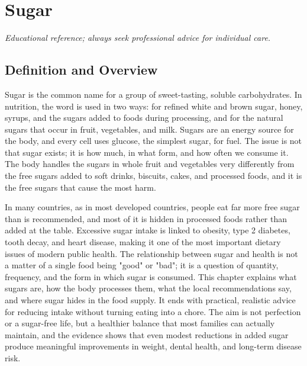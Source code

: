 \chapter{Sugar}

\medskip
\noindent\textit{Educational reference; always seek professional advice for individual care.}

\section*{Definition and Overview}
Sugar is the common name for a group of sweet-tasting, soluble carbohydrates. In nutrition, the word is used in two ways: for refined white and brown sugar, honey, syrups, and the sugars added to foods during processing, and for the natural sugars that occur in fruit, vegetables, and milk. Sugars are an energy source for the body, and every cell uses glucose, the simplest sugar, for fuel. The issue is not that sugar exists; it is how much, in what form, and how often we consume it. The body handles the sugars in whole fruit and vegetables very differently from the free sugars added to soft drinks, biscuits, cakes, and processed foods, and it is the free sugars that cause the most harm.

In many countries, as in most developed countries, people eat far more free sugar than is recommended, and most of it is hidden in processed foods rather than added at the table. Excessive sugar intake is linked to obesity, type 2 diabetes, tooth decay, and heart disease, making it one of the most important dietary issues of modern public health. The relationship between sugar and health is not a matter of a single food being "good" or "bad"; it is a question of quantity, frequency, and the form in which sugar is consumed. This chapter explains what sugars are, how the body processes them, what the local recommendations say, and where sugar hides in the food supply. It ends with practical, realistic advice for reducing intake without turning eating into a chore. The aim is not perfection or a sugar-free life, but a healthier balance that most families can actually maintain, and the evidence shows that even modest reductions in added sugar produce meaningful improvements in weight, dental health, and long-term disease risk.

